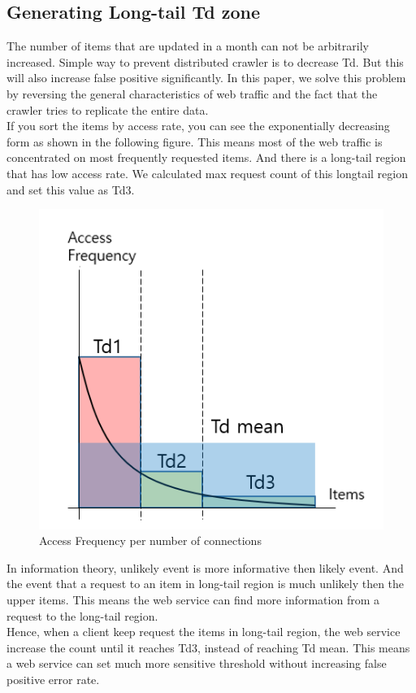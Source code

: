 \documentclass[sigconf,anonymous=true]{acmart}
\begin{document}
\subsection{Generating Long-tail Td zone}
The number of items that are updated in a month can not be arbitrarily increased. Simple way to prevent distributed crawler is to decrease Td. But this will also increase false positive significantly. In this paper, we solve this problem by reversing the general characteristics of web traffic and the fact that the crawler tries to replicate the entire data.\\
If you sort the items by access rate, you can see the exponentially decreasing form as shown in the following figure. This means most of the web traffic is concentrated on most frequently requested items. And there is a long-tail region that has low access rate. We calculated max request count of this longtail region and set this value as Td3.

\begin{figure}[H]
    \includegraphics[width=0.7\columnwidth]{figs/figure_01.png}
    \caption{Access Frequency per number of connections}
    \label{fig:my_label}
\end{figure}

In information theory, unlikely event is more informative then likely event. And the event that a request to an item in long-tail region is much unlikely then the upper items. This means the web service can find more information from a request to the long-tail region.\\
Hence, when a client keep request the items in long-tail region, the web service increase the count until it reaches Td3, instead of reaching Td mean. This means a web service can set much more sensitive threshold without increasing false positive error rate.\\
\end{document}
